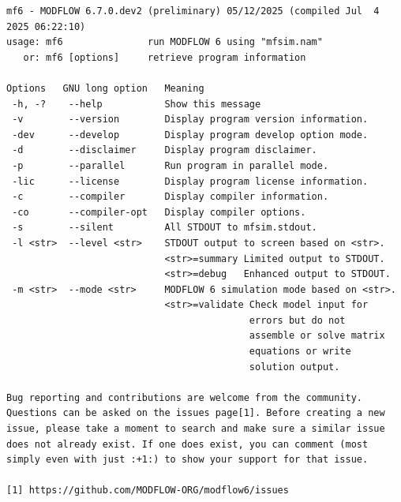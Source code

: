 {\small
\begin{lstlisting}[style=modeloutput]
mf6 - MODFLOW 6.7.0.dev2 (preliminary) 05/12/2025 (compiled Jul  4 2025 06:22:10)
usage: mf6               run MODFLOW 6 using "mfsim.nam"
   or: mf6 [options]     retrieve program information

Options   GNU long option   Meaning 
 -h, -?    --help           Show this message
 -v        --version        Display program version information.
 -dev      --develop        Display program develop option mode.
 -d        --disclaimer     Display program disclaimer.
 -p        --parallel       Run program in parallel mode.
 -lic      --license        Display program license information.
 -c        --compiler       Display compiler information.
 -co       --compiler-opt   Display compiler options.
 -s        --silent         All STDOUT to mfsim.stdout.
 -l <str>  --level <str>    STDOUT output to screen based on <str>.
                            <str>=summary Limited output to STDOUT.
                            <str>=debug   Enhanced output to STDOUT.
 -m <str>  --mode <str>     MODFLOW 6 simulation mode based on <str>.
                            <str>=validate Check model input for
                                           errors but do not 
                                           assemble or solve matrix 
                                           equations or write 
                                           solution output.
                                                                    
Bug reporting and contributions are welcome from the community. 
Questions can be asked on the issues page[1]. Before creating a new
issue, please take a moment to search and make sure a similar issue
does not already exist. If one does exist, you can comment (most
simply even with just :+1:) to show your support for that issue.
                                                                    
[1] https://github.com/MODFLOW-ORG/modflow6/issues
\end{lstlisting}
}
